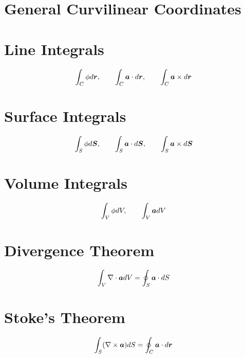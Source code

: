 \section{General Curvilinear Coordinates}

\section{Line Integrals}

\[ \int_C\phi d\boldsymbol{r}, \qquad \int_C\boldsymbol{a}\cdot d\boldsymbol{r}, \qquad 
\int_C\boldsymbol{a}\times d\boldsymbol{r}\]

\section{Surface Integrals}

\[ \int_S\phi d\boldsymbol{S}, \qquad \int_S\boldsymbol{a}\cdot d\boldsymbol{S}, \qquad 
\int_S\boldsymbol{a}\times d\boldsymbol{S}\]

\section{Volume Integrals}

\[ \int_V\phi dV, \qquad \int_V\boldsymbol{a}dV\]

\section{Divergence Theorem}

\begin{equation*}
    \int_V\nabla\cdot\boldsymbol{a} dV = \oint_S\boldsymbol{a}\cdot dS
\end{equation*}

\section{Stoke's Theorem}
    
\begin{equation*}
    \int_S(\nabla\times\boldsymbol{a}) dS = \oint_C\boldsymbol{a}\cdot d\boldsymbol{r}
\end{equation*}

